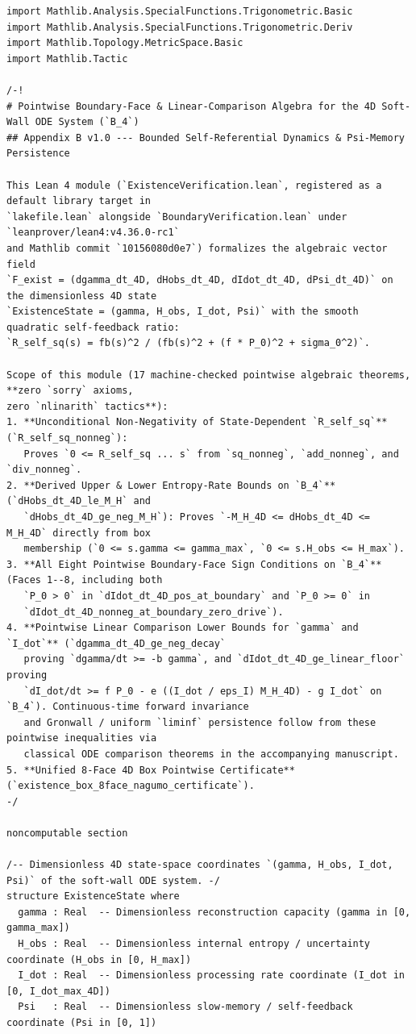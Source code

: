 \documentclass[11pt,a4paper]{article}
\theoremstyle{definition}
\begin{document}
\begin{lstlisting}[language=Lean4]
import Mathlib.Analysis.SpecialFunctions.Trigonometric.Basic
import Mathlib.Analysis.SpecialFunctions.Trigonometric.Deriv
import Mathlib.Topology.MetricSpace.Basic
import Mathlib.Tactic

/-!
# Pointwise Boundary-Face & Linear-Comparison Algebra for the 4D Soft-Wall ODE System (`B_4`)
## Appendix B v1.0 --- Bounded Self-Referential Dynamics & Psi-Memory Persistence

This Lean 4 module (`ExistenceVerification.lean`, registered as a default library target in
`lakefile.lean` alongside `BoundaryVerification.lean` under `leanprover/lean4:v4.36.0-rc1`
and Mathlib commit `10156080d0e7`) formalizes the algebraic vector field
`F_exist = (dgamma_dt_4D, dHobs_dt_4D, dIdot_dt_4D, dPsi_dt_4D)` on the dimensionless 4D state
`ExistenceState = (gamma, H_obs, I_dot, Psi)` with the smooth quadratic self-feedback ratio:
`R_self_sq(s) = fb(s)^2 / (fb(s)^2 + (f * P_0)^2 + sigma_0^2)`.

Scope of this module (17 machine-checked pointwise algebraic theorems, **zero `sorry` axioms,
zero `nlinarith` tactics**):
1. **Unconditional Non-Negativity of State-Dependent `R_self_sq`** (`R_self_sq_nonneg`):
   Proves `0 <= R_self_sq ... s` from `sq_nonneg`, `add_nonneg`, and `div_nonneg`.
2. **Derived Upper & Lower Entropy-Rate Bounds on `B_4`** (`dHobs_dt_4D_le_M_H` and
   `dHobs_dt_4D_ge_neg_M_H`): Proves `-M_H_4D <= dHobs_dt_4D <= M_H_4D` directly from box
   membership (`0 <= s.gamma <= gamma_max`, `0 <= s.H_obs <= H_max`).
3. **All Eight Pointwise Boundary-Face Sign Conditions on `B_4`** (Faces 1--8, including both
   `P_0 > 0` in `dIdot_dt_4D_pos_at_boundary` and `P_0 >= 0` in
   `dIdot_dt_4D_nonneg_at_boundary_zero_drive`).
4. **Pointwise Linear Comparison Lower Bounds for `gamma` and `I_dot`** (`dgamma_dt_4D_ge_neg_decay`
   proving `dgamma/dt >= -b gamma`, and `dIdot_dt_4D_ge_linear_floor` proving
   `dI_dot/dt >= f P_0 - e ((I_dot / eps_I) M_H_4D) - g I_dot` on `B_4`). Continuous-time forward invariance
   and Gronwall / uniform `liminf` persistence follow from these pointwise inequalities via
   classical ODE comparison theorems in the accompanying manuscript.
5. **Unified 8-Face 4D Box Pointwise Certificate** (`existence_box_8face_nagumo_certificate`).
-/

noncomputable section

/-- Dimensionless 4D state-space coordinates `(gamma, H_obs, I_dot, Psi)` of the soft-wall ODE system. -/
structure ExistenceState where
  gamma : Real  -- Dimensionless reconstruction capacity (gamma in [0, gamma_max])
  H_obs : Real  -- Dimensionless internal entropy / uncertainty coordinate (H_obs in [0, H_max])
  I_dot : Real  -- Dimensionless processing rate coordinate (I_dot in [0, I_dot_max_4D])
  Psi   : Real  -- Dimensionless slow-memory / self-feedback coordinate (Psi in [0, 1])


\end{lstlisting}
\end{document}
